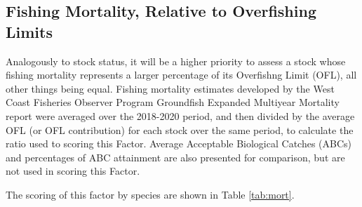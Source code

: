 \documentclass[11pt,
  english,
  a4paper,
]{article}
\begin{document}

\hypertarget{fishing-mortality-relative-to-overfishing-limits}{%
\subsection{Fishing Mortality, Relative to Overfishing Limits}\label{fishing-mortality-relative-to-overfishing-limits}}

\leavevmode\tagmcend\tagstructend


Analogously to stock status, it will be a higher priority to assess a stock whose fishing mortality represents a larger percentage of its Overfishng Limit (OFL), all other things being equal. Fishing mortality estimates developed by the West Coast Fisheries Observer Program Groundfish Expanded Multiyear Mortality report were averaged over the 2018-2020 period, and then divided by the average OFL (or OFL contribution) for each stock over the same period, to calculate the ratio used to scoring this Factor. Average Acceptable Biological Catches (ABCs) and percentages of ABC attainment are also presented for comparison, but are not used in scoring this Factor.

\leavevmode\tagmcend\tagstructend\par


The scoring of this factor by species are shown in Table \ref{tab:mort}.

\leavevmode\tagmcend\tagstructend\par

\begingroup\fontsize{10}{12}\selectfont
\begingroup\fontsize{10}{12}\selectfont
\end{document}
